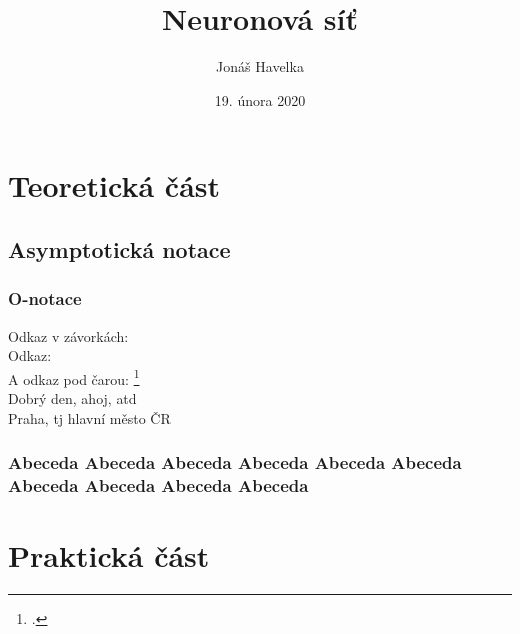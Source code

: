 \documentclass[12pt]{report}			%
\author{Jonáš Havelka}
\title{Neuronová síť}
\date{19. února 2020}
\begin{document}
	\mytitlepage						%
	
	
	\abstrakt{
		\lipsum[1]						%
	}{
		\lipsum[1]						%
	}
	
	\podekovani{
		\lipsum[2]						%
	}
	
	\tableofcontents\newpage			%
	
	
	
	
	
	\part{Teoretická část}
	
		\chapter{Asymptotická notace}
			
			\section{O-notace}
				Odkaz v závorkách: \parencite[see][page 900]{einstein}\\
				Odkaz: \cite{knuthwebsite}\\
				A odkaz pod čarou: \footcite[see][s. 42]{latexcompanion}\\
				Dobrý den, ahoj, \gls{atd}\\
				Praha, \gls{tj} hlavní město ČR
				
			\section{Abeceda Abeceda Abeceda Abeceda Abeceda Abeceda Abeceda Abeceda Abeceda Abeceda }
		
	\part{Praktická část}



	\appendix
	
	\nocite{*}
    \printbibliography					%
    \printglossary[title={Zkratky}]		%
    
    \begin{prilohy}
    \end{prilohy}
\end{document}
